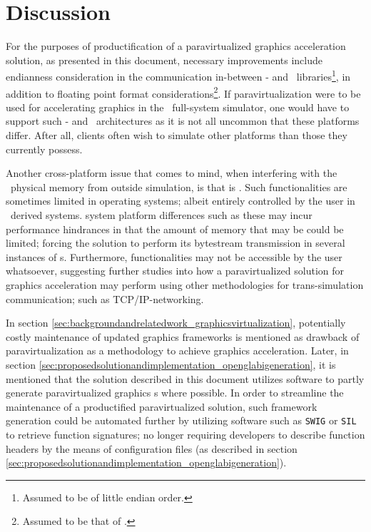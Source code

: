
\chapter{Discussion}
\label{cha:discussion}
For the purposes of productification of a paravirtualized graphics acceleration solution, as presented in this document, necessary improvements include endianness consideration in the communication in-between \dvttermtarget - and \dvttermhost\ libraries\footnote{Assumed to be of little endian order.}, in addition to floating point format considerations\footnote{Assumed to be that of \dvttermieeefp .}.
If paravirtualization were to be used for accelerating graphics in the \dvttermsimics\ full-system simulator, one would have to support such \dvttermtarget - and \dvttermhost\ architectures as it is not all uncommon that these platforms differ.
After all, clients often wish to simulate other platforms than those they currently possess.

Another cross-platform issue that comes to mind, when interfering with the \dvttermtarget\ physical memory from outside simulation, is that is .
Such functionalities are sometimes limited in operating systems; albeit entirely controlled by the user in \dvttermlinux\ derived systems.
 system platform differences such as these may incur performance hindrances in that the amount of memory that may be  could be limited; forcing the solution to perform its bytestream transmission in several instances of \dvttermmagicinstruction s.
Furthermore,  functionalities may not be accessible by the user whatsoever, suggesting further studies into how a paravirtualized solution for graphics acceleration may perform using other methodologies for trans-simulation communication; such as TCP/IP-networking.

In section \ref{sec:backgroundandrelatedwork_graphicsvirtualization}, potentially costly maintenance of updated graphics frameworks is mentioned as drawback of paravirtualization as a methodology to achieve graphics acceleration.
Later, in section \ref{sec:proposedsolutionandimplementation_openglabigeneration}, it is mentioned that the solution described in this document utilizes software to partly generate paravirtualized graphics \dvttermabi s where possible.
In order to streamline the maintenance of a productified paravirtualized solution, such framework generation could be automated further by utilizing software such as \texttt{SWIG} or \texttt{SIL} to retrieve function signatures; no longer requiring developers to describe function headers by the means of configuration files (as described in section \ref{sec:proposedsolutionandimplementation_openglabigeneration}).

